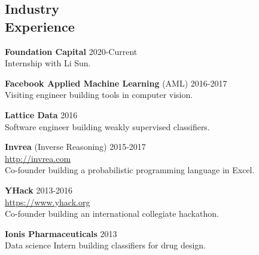 \documentclass[margin, 10pt]{res} %
\begin{document}
\begin{resume}
\section{Industry \\ Experience}

\textbf{Foundation Capital} \hfill 2020-Current \\
Internship with Li Sun.

\textbf{Facebook Applied Machine Learning} (AML) \hfill 2016-2017 \\
Visiting engineer building tools in computer vision.

\textbf{Lattice Data} \hfill 2016 \\
Software engineer building weakly supervised classifiers.

\textbf{Invrea} (Inverse Reasoning) \hfill 2015-2017 \\
\url{http://invrea.com} \\
Co-founder building a probabilistic programming language in Excel.

\textbf{YHack} \hfill 2013-2016 \\
\url{https://www.yhack.org} \\
Co-founder building an international collegiate hackathon.

\textbf{Ionis Pharmaceuticals} \hfill 2013 \\
Data science Intern building classifiers for drug design.


\end{resume}
\end{document}
